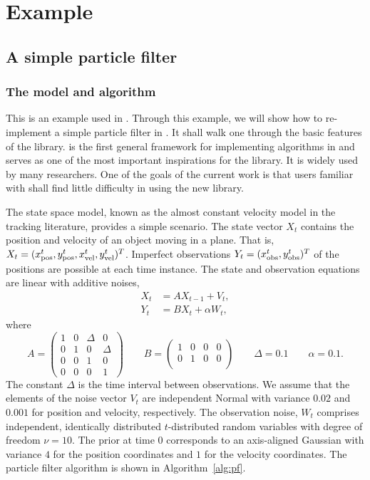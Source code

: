 \documentclass[11pt, fontset=Minion, showoverfull,
bib, biblatexstyle=numeric, mintcode, minted=cache]{marticle}
\begin{document}
\section{Example}
\label{sec:Example}

\subsection{A simple particle filter}
\label{sub:A simple particle filter}

\subsubsection{The model and algorithm}

This is an example used in \csmctc. Through this example, we will show how to
re-implement a simple particle filter in \vsmc. It shall walk one through the
basic features of the library. \smctc is the first general framework for
implementing \smc algorithms in \cpp and serves as one of the most important
inspirations for the \vsmc library. It is widely used by many researchers. One
of the goals of the current work is that users familiar with \smctc shall find
little difficulty in using the new library.

The state space model, known as the almost constant velocity model in the
tracking literature, provides a simple scenario. The state vector $X_t$
contains the position and velocity of an object moving in a plane. That is,
$X_t = (x_{\mathrm{pos}}^t, y_{\mathrm{pos}}^t, x_{\mathrm{vel}}^t, y_{\mathrm{vel}}^t)^T$. Imperfect observations $Y_t =
(x_{\mathrm{obs}}^t, y_{\mathrm{obs}}^t)^T$ of the positions are possible at each time instance. The
state and observation equations are linear with additive noises,
\begin{align*}
  X_t &= AX_{t-1} + V_t, \\
  Y_t &= BX_t + \alpha W_t,
\end{align*}
where
\begin{equation*}
  A = \begin{pmatrix}
    1 & 0 & \Delta & 0 \\
    0 & 1 & 0 & \Delta \\
    0 & 0 & 1 & 0 \\
    0 & 0 & 0 & 1
  \end{pmatrix} \qquad
  B = \begin{pmatrix}
    1 & 0 & 0 & 0 \\
    0 & 1 & 0 & 0 \\
  \end{pmatrix} \qquad
  \Delta = 0.1 \qquad
  \alpha = 0.1.
\end{equation*}
The constant $\Delta$ is the time interval between observations. We assume
that the elements of the noise vector $V_t$ are independent Normal with
variance $0.02$ and $0.001$ for position and velocity, respectively. The
observation noise, $W_t$ comprises independent, identically distributed
$t$-distributed random variables with degree of freedom $\nu = 10$. The prior
at time $0$ corresponds to an axis-aligned Gaussian with variance $4$ for the
position coordinates and $1$ for the velocity coordinates. The particle filter
algorithm is shown in Algorithm~\ref{alg:pf}.
\end{document}
